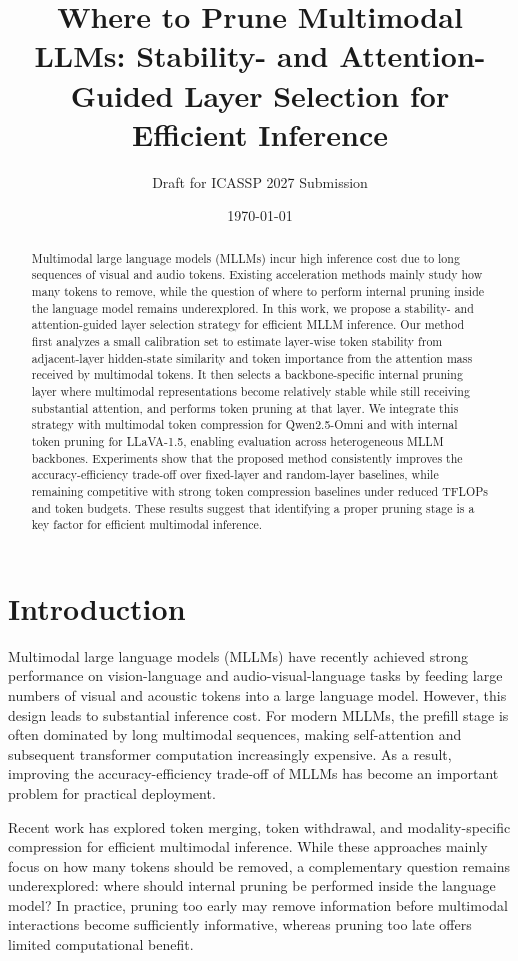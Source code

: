 \documentclass[10pt,a4paper]{article}
\title{\textbf{Where to Prune Multimodal LLMs: Stability- and Attention-Guided Layer Selection for Efficient Inference}}
\author{Draft for ICASSP 2027 Submission}
\date{\today}
\begin{document}
\maketitle

\begin{abstract}
Multimodal large language models (MLLMs) incur high inference cost due to long sequences of visual and audio tokens. Existing acceleration methods mainly study how many tokens to remove, while the question of where to perform internal pruning inside the language model remains underexplored. In this work, we propose a stability- and attention-guided layer selection strategy for efficient MLLM inference. Our method first analyzes a small calibration set to estimate layer-wise token stability from adjacent-layer hidden-state similarity and token importance from the attention mass received by multimodal tokens. It then selects a backbone-specific internal pruning layer where multimodal representations become relatively stable while still receiving substantial attention, and performs token pruning at that layer. We integrate this strategy with multimodal token compression for Qwen2.5-Omni and with internal token pruning for LLaVA-1.5, enabling evaluation across heterogeneous MLLM backbones. Experiments show that the proposed method consistently improves the accuracy-efficiency trade-off over fixed-layer and random-layer baselines, while remaining competitive with strong token compression baselines under reduced TFLOPs and token budgets. These results suggest that identifying a proper pruning stage is a key factor for efficient multimodal inference.
\end{abstract}

\section{Introduction}
Multimodal large language models (MLLMs) have recently achieved strong performance on vision-language and audio-visual-language tasks by feeding large numbers of visual and acoustic tokens into a large language model. However, this design leads to substantial inference cost. For modern MLLMs, the prefill stage is often dominated by long multimodal sequences, making self-attention and subsequent transformer computation increasingly expensive. As a result, improving the accuracy-efficiency trade-off of MLLMs has become an important problem for practical deployment.

Recent work has explored token merging, token withdrawal, and modality-specific compression for efficient multimodal inference. While these approaches mainly focus on how many tokens should be removed, a complementary question remains underexplored: where should internal pruning be performed inside the language model? In practice, pruning too early may remove information before multimodal interactions become sufficiently informative, whereas pruning too late offers limited computational benefit.
\end{document}
